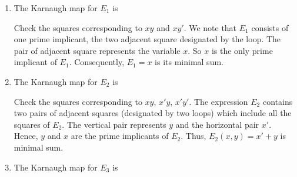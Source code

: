 \documentclass[../main-sheet.tex]{subfiles}
\begin{document}
\begin{soln}
    \hfill
    \begin{enumerate}[label=(\alph*)]
        \item The Karnaugh map for $ E_1 $ is
        \begin{center}
        \end{center}
        Check the squares corresponding to $ x y $ and $ x y' $. We note that $ E_1 $ consists of one prime implicant, the two adjacent square designated by the loop. The pair of adjacent square represents the variable $ x $. So $ x $ is the only prime implicant of $ E_1 $. Consequently, $ E_1 = x $ is its minimal sum.
        \item The Karnaugh map for $ E_2 $ is
        \begin{center}
        \end{center}
        Check the squares corresponding to $ x y $, $ x' y $, $ x' y' $. The expression $ E_2 $ contains two pairs of adjacent squares (designated by two loops) which include all the squares of $ E_2 $. The vertical pair represents $ y $ and the horizontal pair $ x' $. Hence, $ y $ and $ x $ are the prime implicants of $ E_2 $. Thus, $ E_2(x,y)=x'+y $ is minimal sum.
        \item The Karnaugh map for $ E_3 $ is
        \begin{center}
            \begin{tikzpicture}

\end{tikzpicture}
\end{center}
\end{enumerate}
\end{soln}
\end{document}
